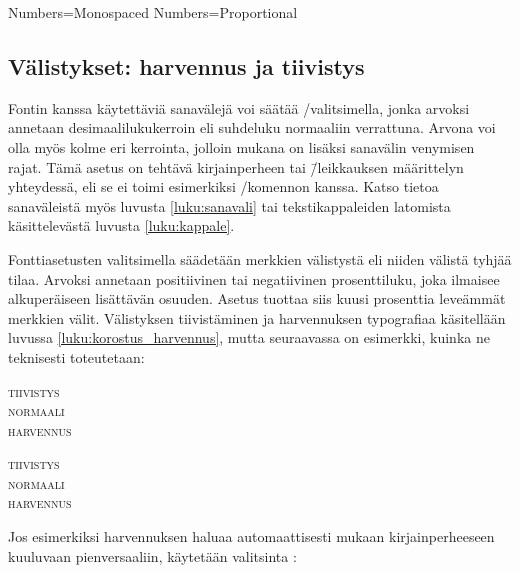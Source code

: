 \begin{koodilohkosis}
  Numbers=Monospaced   %
  Numbers=Proportional %
\end{koodilohkosis}

\subsection{Välistykset: harvennus ja tiivistys}
\label{luku:fontit_valistys}

Fontin kanssa käytettäviä sanavälejä voi säätää
\-/valitsimella,  jonka
arvoksi annetaan desimaalilukukerroin eli suhdeluku normaaliin
verrattuna. Arvona voi olla myös kolme eri kerrointa, jolloin mukana on
lisäksi sanavälin venymisen rajat. Tämä asetus on tehtävä kirjainperheen
tai \=/leikkauksen määrittelyn yhteydessä, eli se ei toimi esimerkiksi
\-/komennon kanssa. Katso tietoa
sanaväleistä myös luvusta \ref{luku:sanavali} tai tekstikappaleiden
latomista käsittelevästä luvusta \ref{luku:kappale}. \noclub[2]

Fontti\-asetusten valitsimella 
 säädetään merkkien välistystä eli niiden
välistä tyhjää tilaa. Arvoksi annetaan positiivinen tai negatiivinen
prosenttiluku, joka ilmaisee alkuperäiseen lisättävän osuuden. Asetus
 tuottaa siis kuusi prosenttia leveämmät
merkkien välit. Välistyksen tiivistäminen ja harvennuksen typografiaa
käsitellään luvussa \ref{luku:korostus_harvennus}, mutta seuraavassa on
esimerkki, kuinka ne teknisesti toteutetaan:

\begin{koodilohkosis}
  \scshape { tiivistys} \\
  normaali \\ { harvennus}
\end{koodilohkosis}

\begin{tulossis}
  \scshape { tiivistys} \\
  normaali \\ { harvennus}
\end{tulossis}

Jos esimerkiksi harvennuksen haluaa automaattisesti mukaan
kirjainperheeseen kuuluvaan pienversaaliin, käytetään valitsinta
:

